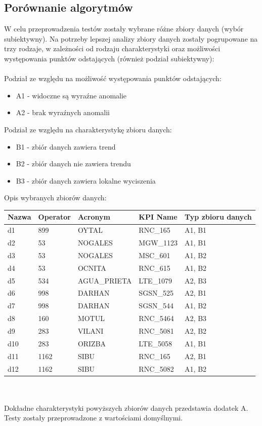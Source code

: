 \documentclass[eng,printmode]{mgr}
\begin{document}
\subsection{Porównanie algorytmów}
W celu przeprowadzenia testów zostały wybrane różne zbiory danych (wybór subiektywny). Na potrzeby lepszej analizy zbiory danych zostały pogrupowane na trzy rodzaje, w zależności od rodzaju charakterystyki oraz możliwości występowania punktów odstających (również podział subiektywny):
\\\\
Podział ze względu na możliwość występowania punktów odstających:
\begin{itemize}
  \item A1 - widoczne są wyraźne anomalie
  \item A2 - brak wyraźnych anomalii
\end{itemize}
Podział ze względu na charakterystykę zbioru danych:
\begin{itemize}
  \item B1 - zbiór danych zawiera trend
  \item B2 - zbiór danych nie zawiera trendu
  \item B3 - zbiór danych zawiera lokalne wyciszenia
\end{itemize}

Opis wybranych zbiorów danych:
\\
\begingroup
\fontsize{10pt}{12pt}\selectfont

\begin{tabu} to 0.9\textwidth { | X[l] | X[l] | X[l] | X[l] | X[l] |}
\hline
\textbf{Nazwa} & \textbf{Operator} & \textbf{Acronym} & \textbf{KPI Name} & \textbf{Typ zbioru danych}\\
\hline
d1 & 899 & OYTAL & RNC\_165 & A1, B1 \\
\hline
d2 & 53 & NOGALES & MGW\_1123 & A1, B1 \\
\hline
d3 & 53 & NOGALES & MSC\_601 & A1, B2 \\
\hline
d4 & 53 & OCNITA & RNC\_615 & A1, B2\\
\hline
d5 & 534 & AGUA\_PRIETA & LTE\_1079 & A2, B3 \\
\hline
d6 & 998 & DARHAN & SGSN\_525 & A2, B1 \\
\hline
d7 & 998 & DARHAN & SGSN\_544 & A1, B2 \\
\hline
d8 & 160 & MOTUL & RNC\_5464 & A2, B3 \\
\hline
d9 & 283 & VILANI & RNC\_5081 & A2, B2 \\
\hline
d10 & 283 & ORIZBA & LTE\_5058 & A1, B1 \\
\hline
d11 & 1162 & SIBU & RNC\_165 & A2, B1 \\
\hline
d12 & 1162 & SIBU & RNC\_5082 & A1, B2\\
\hline
\end{tabu}
\endgroup
\\\\
Dokładne charakterystyki powyższych zbiorów danych przedstawia dodatek A. Testy zostały przeprowadzone z wartościami domyślnymi.
\end{document}
